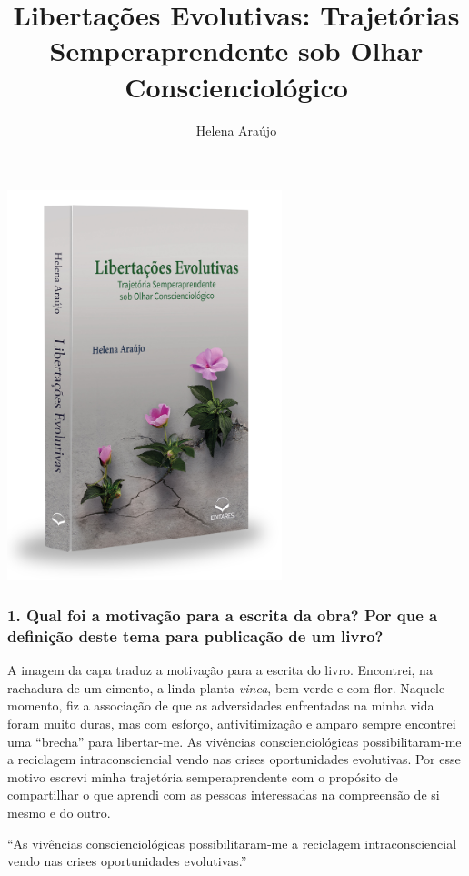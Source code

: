 \documentclass{gescons}
\author{Helena Araújo}
\title{Libertações Evolutivas: Trajetórias Semperaprendente sob Olhar Conscienciológico}
\begin{document}
    \makeentrevistatitle

    \begin{multicols}{2}

\begin{center}
    \includegraphics[width=8cm]{articles/entrevista/mockups/Helena_Araujo.png}
\end{center}


\subsubsection{1. Qual foi a motivação para a escrita da obra? Por que a definição deste tema para publicação de um livro?}

A imagem da capa traduz a motivação para a escrita do livro. Encontrei, na rachadura de um cimento, a linda planta \emph{vinca}, bem verde e com flor. Naquele momento, fiz a associação de que as adversidades enfrentadas na minha vida foram muito duras, mas com esforço, antivitimização e amparo sempre encontrei uma ``brecha'' para libertar-me. As vivências conscienciológicas possibilitaram-me a reciclagem intraconsciencial vendo nas crises oportunidades evolutivas. Por esse motivo escrevi minha trajetória semperaprendente com o propósito de compartilhar o que aprendi com as pessoas interessadas na compreensão de si mesmo e do outro.

\begin{pullquote}
``As vivências conscienciológicas possibilitaram-me a reciclagem intraconsciencial vendo nas crises oportunidades evolutivas.''
\end{pullquote}


\end{multicols}
\end{document}

